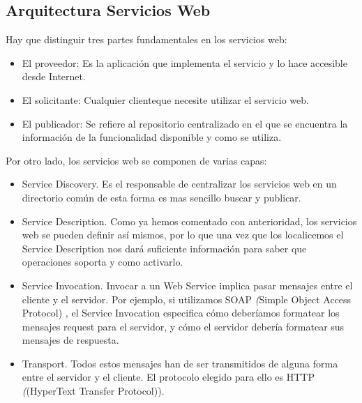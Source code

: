 \subsection{Arquitectura Servicios Web}
\label{cap:subsec:arquitecturaserviciosweb}
Hay que distinguir tres partes fundamentales en los servicios web:
\begin{itemize}
	\item El proveedor: Es la aplicación que implementa el servicio y lo hace accesible desde Internet.
	\item El solicitante: Cualquier clienteque necesite utilizar el servicio web.
	\item El publicador: Se refiere al repositorio centralizado en el que se encuentra la información de la funcionalidad disponible y como se utiliza.

\end{itemize}
 Por otro lado, los servicios web se componen de varias capas:
\begin{itemize}
 \item Service Discovery. Es el responsable de centralizar los servicios web en un directorio común de esta forma es mas sencillo buscar y publicar.
 \item Service Description. Como ya hemos comentado con anterioridad, los servicios web se pueden definir así mismos, por lo que una vez que los localicemos el Service Description nos dará suficiente información para saber que operaciones soporta y como activarlo.
 \item Service Invocation. Invocar a un Web Service implica pasar mensajes entre el cliente y el servidor. Por ejemplo, si utilizamos SOAP  \textit({Simple Object Access Protocol}) , el Service Invocation especifica cómo deberíamos formatear los mensajes request para el servidor, y cómo el servidor debería formatear sus mensajes de respuesta.
 \item Transport. Todos estos mensajes han de ser transmitidos de alguna forma entre el servidor y el cliente. El protocolo elegido para ello es HTTP  \textit({(HyperText Transfer Protocol)}). 
\end{itemize}

